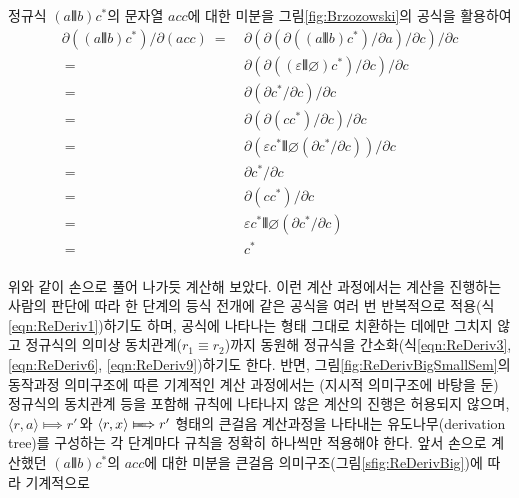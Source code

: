 정규식 $(a\VERT b)c^{*}$의 문자열 $acc$에 대한 미분을
그림\;\ref{fig:Brzozowski}의 공식을 활용하여 \vspace*{-2ex}
{\addtolength{\jot}{-1ex}
\begin{align}
     \partial((a\VERT b)c^{*})/\partial(acc)
~=~& \partial(\partial(\partial((a\VERT b)c^{*})
            / \partial a)/\partial c)/\partial c     \label{eqn:ReDeriv1}\\
~=~& \partial(\partial((\varepsilon\VERT\varnothing)c^{*})
            / \partial c)/\partial c                 \label{eqn:ReDeriv2}\\
~=~& \partial(\partial c^{*}/\partial c)/\partial c  \label{eqn:ReDeriv3}\\
~=~& \partial(\partial(cc^{*})/\partial c)/\partial c \label{eqn:ReDeriv4}\\
~=~& \partial(\varepsilon c^{*}\VERT\varnothing(\partial c^{*}/\partial c))
     /\partial c                                     \label{eqn:Rederiv5}\\
~=~& \partial c^{*}/\partial c                       \label{eqn:ReDeriv6}\\
~=~& \partial(cc^{*})/\partial c                     \label{eqn:ReDeriv7}\\
~=~& \varepsilon c^{*}\VERT\varnothing(\partial c^{*}/\partial c)
                                                     \label{eqn:ReDeriv8}\\
~=~& c^{*}                                           \label{eqn:ReDeriv9}
\end{align}
\vspace*{-5ex}\\
}
위와 같이 손으로 풀어 나가듯 계산해 보았다. 이런 계산 과정에서는
계산을 진행하는 사람의 판단에 따라 한 단계의 등식 전개에 같은 공식을
여러 번 반복적으로 적용(식\;\ref{eqn:ReDeriv1})하기도 하며,
공식에 나타나는 형태 그대로 치환하는 데에만 그치지 않고 정규식의 의미상
동치관계($r_1\equiv r_2$)까지 동원해 정규식을 간소화(식\;\ref{eqn:ReDeriv3},
\ref{eqn:ReDeriv6}, \ref{eqn:ReDeriv9})하기도 한다.
반면, 그림\;\ref{fig:ReDerivBigSmallSem}의
동작과정 의미구조에 따른 기계적인 계산 과정에서는 (지시적 의미구조에
바탕을 둔) 정규식의 동치관계 등을 포함해 규칙에 나타나지 않은 계산의
진행은 허용되지 않으며, $\langle r,a\rangle\Longmapsto r'$\,와
$\langle r,x\rangle\LONGmapsto r'$ 형태의 큰걸음
계산과정을 나타내는 유도나무(derivation tree)를 구성하는 각 단계마다
규칙을 정확히 하나씩만 적용해야 한다. 앞서 손으로 계산했던
$(a\VERT b)c^{*}$의 $acc$에 대한 미분을
큰걸음 의미구조(그림\;\ref{sfig:ReDerivBig})에 따라 기계적으로
